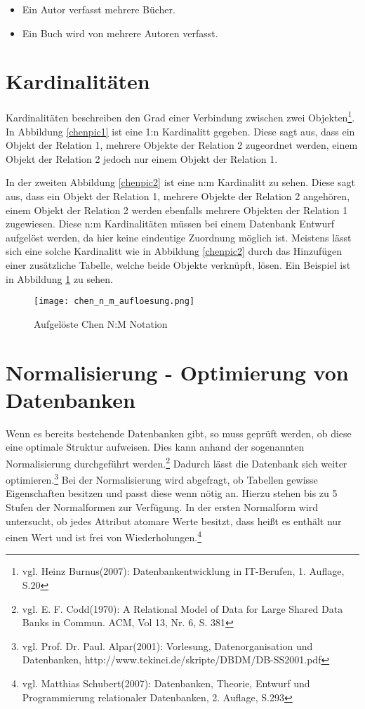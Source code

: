 \begin{itemize}
\item Ein Autor verfasst mehrere Bücher.
\item Ein Buch wird von mehrere Autoren verfasst.
\end{itemize}



\section{Kardinalitäten}

Kardinalitäten beschreiben den Grad einer Verbindung zwischen zwei Objekten\footnote{vgl. Heinz Burnus(2007): Datenbankentwicklung in IT-Berufen, 1. Auflage, S.20}.
In Abbildung \ref{chenpic1} ist eine 1:n Kardinalitt gegeben.
Diese sagt aus, dass ein Objekt der Relation 1, mehrere Objekte der Relation 2 zugeordnet werden, einem Objekt der Relation 2 jedoch nur einem Objekt der Relation 1.

In der zweiten Abbildung \ref{chenpic2} ist eine n:m Kardinalitt zu sehen.
Diese sagt aus, dass ein Objekt der Relation 1, mehrere Objekte der Relation 2 angehören, einem Objekt der Relation 2 werden ebenfalls mehrere Objekten der Relation 1 zugewiesen.
Diese n:m Kardinalitäten müssen bei einem Datenbank Entwurf aufgelöst werden, da hier keine eindeutige Zuordnung möglich ist. Meistens lässt sich eine solche Kardinalitt wie in Abbildung \ref{chenpic2} durch das Hinzufügen einer zusätzliche Tabelle, welche beide Objekte verknüpft, lösen.
Ein Beispiel ist in Abbildung \ref{chenpic3} zu sehen.

\begin{figure}[H]
\begin{center}
\texttt{[image: chen\_n\_m\_aufloesung.png]}
\caption{Aufgelöste Chen N:M Notation}
\label{chenpic3}
\end{center}
\end{figure}

\section{Normalisierung - Optimierung von Datenbanken}
\label{secNormalisierung}
Wenn es bereits bestehende Datenbanken gibt, so muss geprüft werden, ob diese eine optimale Struktur aufweisen. Dies kann anhand der sogenannten Normalisierung durchgeführt werden.\footnote{vgl. E. F. Codd(1970): A Relational Model of Data for Large Shared Data Banks in Commun. ACM, Vol 13, Nr. 6, S. 381} Dadurch lässt die Datenbank sich weiter optimieren.\footnote{vgl. Prof. Dr. Paul. Alpar(2001): Vorlesung, Datenorganisation und Datenbanken,  http://www.tekinci.de/skripte/DBDM/DB-SS2001.pdf}
Bei der Normalisierung wird abgefragt, ob Tabellen gewisse Eigenschaften besitzen und passt diese wenn nötig an.
Hierzu stehen bis zu 5 Stufen der Normalformen zur Verfügung.
In der ersten Normalform wird untersucht, ob jedes Attribut atomare Werte besitzt, dass heißt es enthält nur einen Wert und ist frei von Wiederholungen.\footnote{vgl. Matthias Schubert(2007): Datenbanken, Theorie, Entwurf und Programmierung relationaler Datenbanken, 2. Auflage, S.293}



